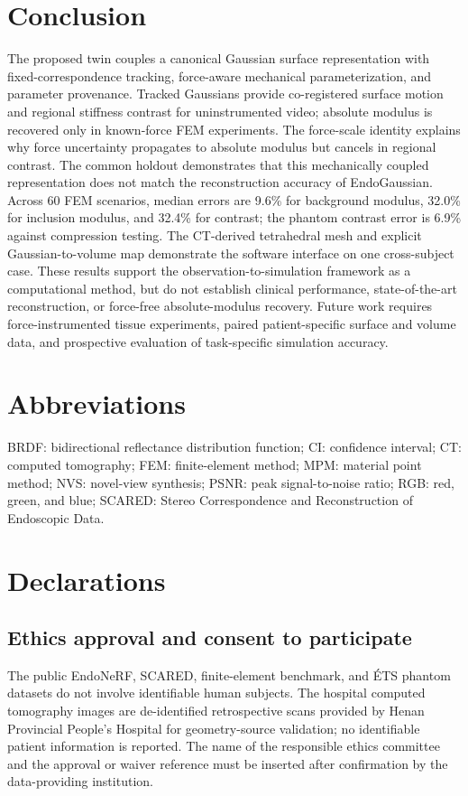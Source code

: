 \documentclass[smallextended]{svjour3}
\begin{document}
\section{Conclusion}
\label{sec:conclusion}
The proposed twin couples a canonical Gaussian surface representation with
fixed-correspondence tracking, force-aware mechanical parameterization, and
parameter provenance. Tracked Gaussians provide co-registered surface
motion and regional stiffness contrast for uninstrumented video; absolute
modulus is recovered only in known-force FEM experiments. The force-scale
identity explains why force uncertainty propagates to absolute modulus but
cancels in regional contrast. The common holdout demonstrates that this
mechanically coupled representation does not match the reconstruction
accuracy of EndoGaussian. Across 60 FEM scenarios, median errors are 9.6\%
for background modulus, 32.0\% for inclusion modulus, and 32.4\% for
contrast; the phantom contrast error is 6.9\% against compression testing.
The CT-derived tetrahedral mesh and explicit Gaussian-to-volume map
demonstrate the software interface on one cross-subject case. These
results support the observation-to-simulation framework as a computational
method, but do not establish clinical performance, state-of-the-art
reconstruction, or force-free absolute-modulus recovery. Future work
requires force-instrumented tissue experiments, paired patient-specific
surface and volume data, and prospective evaluation of task-specific
simulation accuracy.



\section*{Abbreviations}
BRDF: bidirectional reflectance distribution function; CI: confidence
interval; CT: computed tomography; FEM: finite-element method; MPM:
material point method; NVS: novel-view synthesis; PSNR: peak
signal-to-noise ratio; RGB: red, green, and blue; SCARED: Stereo
Correspondence and Reconstruction of Endoscopic Data.

\section*{Declarations}

\subsection*{Ethics approval and consent to participate}
The public EndoNeRF, SCARED, finite-element benchmark, and \'ETS phantom
datasets do not involve identifiable human subjects. The hospital computed
tomography images are de-identified retrospective scans provided by Henan
Provincial People's Hospital for geometry-source validation; no
identifiable patient information is reported. The name of the responsible
ethics committee and the approval or waiver reference must be inserted
after confirmation by the data-providing institution.
\end{document}
